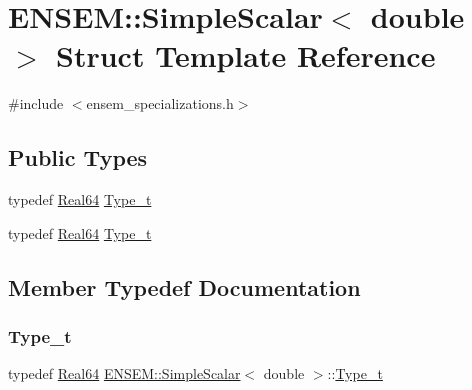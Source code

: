 \hypertarget{structENSEM_1_1SimpleScalar_3_01double_01_4}{}\section{E\+N\+S\+EM\+:\+:Simple\+Scalar$<$ double $>$ Struct Template Reference}
\label{structENSEM_1_1SimpleScalar_3_01double_01_4}


{\ttfamily \#include $<$ensem\+\_\+specializations.\+h$>$}

\subsection*{Public Types}
\begin{DoxyCompactItemize}
\item 
typedef \mbox{\hyperlink{group__defs_gaae0bff35c031375b1ffeb693402496c8}{Real64}} \mbox{\hyperlink{structENSEM_1_1SimpleScalar_3_01double_01_4_a1f42edea984ac3b783290e5043381603}{Type\+\_\+t}}
\item 
typedef \mbox{\hyperlink{group__defs_gaae0bff35c031375b1ffeb693402496c8}{Real64}} \mbox{\hyperlink{structENSEM_1_1SimpleScalar_3_01double_01_4_a1f42edea984ac3b783290e5043381603}{Type\+\_\+t}}
\end{DoxyCompactItemize}


\subsection{Member Typedef Documentation}
\mbox{\label{structENSEM_1_1SimpleScalar_3_01double_01_4_a1f42edea984ac3b783290e5043381603}} 
\subsubsection{\texorpdfstring{Type\_t}{Type\_t}\hspace{0.1cm}{\footnotesize\ttfamily [1/2]}}
{\footnotesize\ttfamily typedef \mbox{\hyperlink{group__defs_gaae0bff35c031375b1ffeb693402496c8}{Real64}} \mbox{\hyperlink{structENSEM_1_1SimpleScalar}{E\+N\+S\+E\+M\+::\+Simple\+Scalar}}$<$ double $>$\+::\mbox{\hyperlink{structENSEM_1_1SimpleScalar_3_01double_01_4_a1f42edea984ac3b783290e5043381603}{Type\+\_\+t}}}

